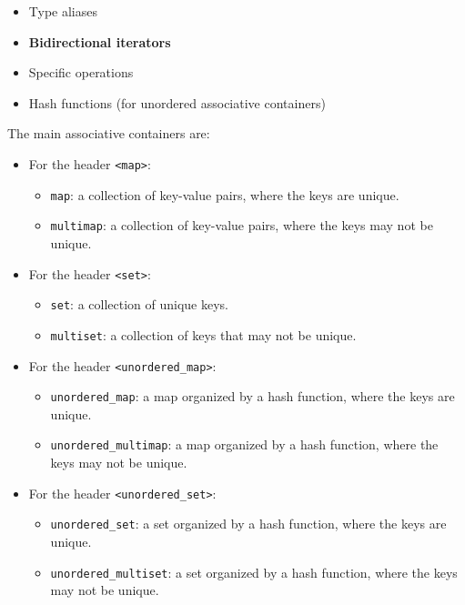 \begin{itemize}
    \item Type aliases
    \item \textbf{Bidirectional iterators}
    \item Specific operations
    \item Hash functions (for unordered associative containers)
\end{itemize}

The main associative containers are:

\begin{itemize}
    \item For the header \texttt{<map>}:
    \begin{itemize}
        \item \texttt{map}: a collection of key-value pairs, where the keys are unique.
        \item \texttt{multimap}: a collection of key-value pairs, where the keys may not be unique.
    \end{itemize}

    \item For the header \texttt{<set>}:
    \begin{itemize}
        \item \texttt{set}: a collection of unique keys.
        \item \texttt{multiset}: a collection of keys that may not be unique.
    \end{itemize}

    \item For the header \texttt{<unordered\_map>}:
    \begin{itemize}
        \item \texttt{unordered\_map}: a map organized by a hash function, where the keys are unique.
        \item \texttt{unordered\_multimap}: a map organized by a hash function, where the keys may not be unique.
    \end{itemize}

    \item For the header \texttt{<unordered\_set>}:
    \begin{itemize}
        \item \texttt{unordered\_set}: a set organized by a hash function, where the keys are unique.
        \item \texttt{unordered\_multiset}: a set organized by a hash function, where the keys may not be unique.
    \end{itemize}
\end{itemize}

